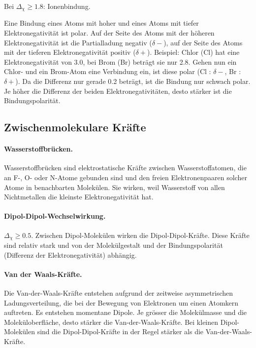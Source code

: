 Bei $\Delta_\chi \geqslant 1.8$: Ionenbindung.

\begin{definition}[Bindungspolarität]
	Eine Bindung eines Atoms mit hoher und eines Atoms mit tiefer Elektronegativität ist
	polar. Auf der Seite des Atoms mit der höheren Elektronegativität ist die Partialladung
	negativ ($\delta -$), auf der Seite des Atoms mit der tieferen Elektronegativität positiv ($\delta +$).
	Beispiel: Chlor (Cl) hat eine Elektronegativität von 3.0, bei Brom (Br) beträgt sie nur
	2.8. Gehen nun ein Chlor- und ein Brom-Atom eine Verbindung ein, ist diese polar (Cl :
	$\delta -$, Br : $\delta +$). Da die Differenz nur gerade 0.2 beträgt, ist die Bindung nur schwach polar.
	Je höher die Differenz der beiden Elektronegativitäten, desto stärker ist die Bindungspolarität.
\end{definition}

\subsection{Zwischenmolekulare Kräfte}

\paragraph{Wasserstoffbrücken.} 

Wasserstoffbrücken sind elektrostatische Kräfte zwischen Wasserstoffatomen, die an F-,
O- oder N-Atome gebunden sind und den freien Elektronenpaaren solcher Atome in benachbarten
Molekülen. Sie wirken, weil Wasserstoff von allen Nichtmetallen die kleinste
Elektronegativität hat.

\paragraph{Dipol-Dipol-Wechselwirkung.}

$\Delta_\chi \geqslant 0.5$. Zwischen Dipol-Molekülen wirken die Dipol-Dipol-Kräfte. Diese Kräfte sind relativ stark
und von der Molekülgestalt und der Bindungspolarität (Differenz der Elektronegativität)
abhängig.

\paragraph{Van der Waals-Kräfte.}

 Die Van-der-Waals-Kräfte entstehen aufgrund der zeitweise asymmetrischen Ladungsverteilung,
 die bei der Bewegung von Elektronen um einen Atomkern auftreten. Es entstehen
 momentane Dipole. Je grösser die Molekülmasse und die Moleküloberfläche, desto stärker
 die Van-der-Waals-Kräfte. Bei kleinen Dipol-Molekülen sind die Dipol-Dipol-Kräfte
 in der Regel stärker als die Van-der-Waals-Kräfte.


